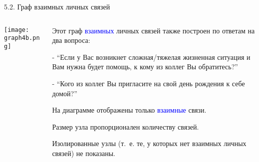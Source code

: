 \begin{frame}{5.2. Граф взаимных личных связей}

\begin{columns}
\begin{column}{0.75\textwidth} 
\centering
          \texttt{[image: graph4b.png]}
\end{column}
\begin{column}{0.25\textwidth} 
\tiny
Этот граф \textcolor{blue}{взаимных} личных связей также построен по ответам на два вопроса:
\smallskip

- ``Если у Вас возникнет сложная/тяжелая жизненная ситуация и Вам нужна будет помощь, к кому из коллег Вы обратитесь?''
\smallskip

- ``Кого из коллег Вы пригласите на свой день рождения к себе домой?''
\smallskip

На диаграмме отображены только \textcolor{blue}{взаимные} связи.
\smallskip

Размер узла пропорционален количеству связей.
\smallskip

Изолированные узлы (т.~е. те, у которых нет взаимных личных связей) не показаны.

\end{column}
\end{columns}
\end{frame}


